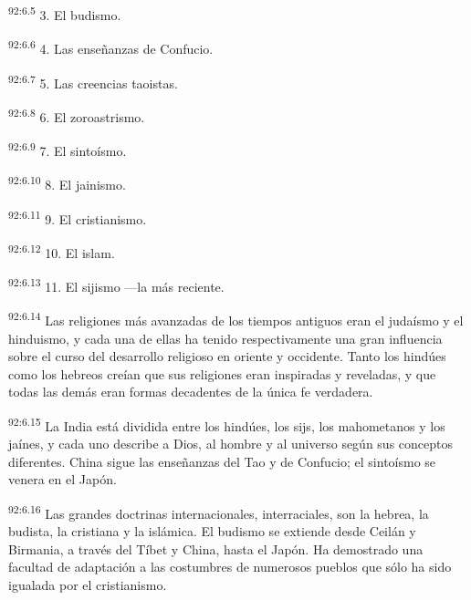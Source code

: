 \documentclass[twoside, 11pt]{book}
\begin{document}
\par
\textsuperscript{92:6.5} 3. El budismo.

\par
\textsuperscript{92:6.6} 4. Las enseñanzas de Confucio.

\par
\textsuperscript{92:6.7} 5. Las creencias taoistas.

\par
\textsuperscript{92:6.8} 6. El zoroastrismo.

\par
\textsuperscript{92:6.9} 7. El sintoísmo.

\par
\textsuperscript{92:6.10} 8. El jainismo.

\par
\textsuperscript{92:6.11} 9. El cristianismo.

\par
\textsuperscript{92:6.12} 10. El islam.

\par
\textsuperscript{92:6.13} 11. El sijismo ---la más reciente.

\par
\textsuperscript{92:6.14} Las religiones más avanzadas de los tiempos antiguos eran el judaísmo y el hinduismo, y cada una de ellas ha tenido respectivamente una gran influencia sobre el curso del desarrollo religioso en oriente y occidente. Tanto los hindúes como los hebreos creían que sus religiones eran inspiradas y reveladas, y que todas las demás eran formas decadentes de la única fe verdadera.

\par
\textsuperscript{92:6.15} La India está dividida entre los hindúes, los sijs, los mahometanos y los jaínes, y cada uno describe a Dios, al hombre y al universo según sus conceptos diferentes. China sigue las enseñanzas del Tao y de Confucio; el sintoísmo se venera en el Japón.

\par
\textsuperscript{92:6.16} Las grandes doctrinas internacionales, interraciales, son la hebrea, la budista, la cristiana y la islámica. El budismo se extiende desde Ceilán y Birmania, a través del Tíbet y China, hasta el Japón. Ha demostrado una facultad de adaptación a las costumbres de numerosos pueblos que sólo ha sido igualada por el cristianismo.
\end{document}
